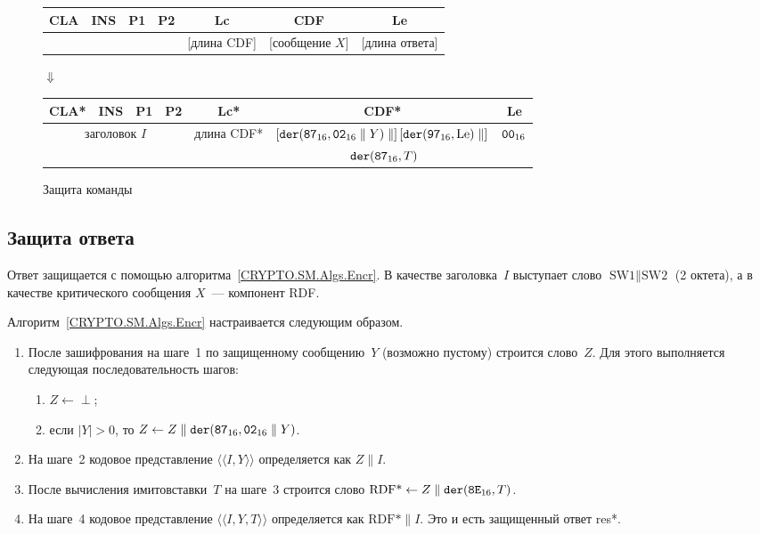 \begin{figure}[!h]
\begin{center}
\begin{tabular}{|c|c|c|c|c|c|c|}
\hline
CLA & INS & P1 & P2 & Lc & CDF & Le \\
\hline
\hline
\multicolumn{4}{|c|}{} & [длина CDF] & [сообщение $X$] & [длина ответа]\\
\hline
\end{tabular}

\vskip3pt$\Downarrow$\vskip3pt

\begin{tabular}{|c|c|c|c|c|c|c|}
\hline
CLA* & INS & P1 & P2 & Lc* & CDF* & Le \\
\hline
\hline
\multicolumn{4}{|c|}{заголовок $I$} & длина CDF* & 
$\left[\texttt{der}(\texttt{87}_{16},\texttt{02}_{16}\parallel Y)\parallel\right]
\left[\texttt{der}(\texttt{97}_{16},\text{Le})\parallel\right]$ & $\texttt{00}_{16}$\\
\multicolumn{4}{|c|}{} & & 
$\phantom{[}\texttt{der}(\texttt{87}_{16},T)$\hfill\mbox{} &\\
\hline
\end{tabular}
\end{center}
\caption{Защита команды}\label{Fig.CMDS.CmdEncr}
\end{figure}

\subsection{Защита ответа}\label{CMDS.SM.EncrRez}

Ответ защищается с помощью алгоритма~\ref{CRYPTO.SM.Algs.Encr}. 
В качестве заголовка~$I$ выступает слово $\text{SW1} \parallel\text{SW2}$ 
(2 октета), а в качестве критического сообщения $X$~--- компонент RDF. 

Алгоритм~\ref{CRYPTO.SM.Algs.Encr} настраивается следующим образом.
\begin{enumerate}
\item
После зашифрования на шаге~1 по защищенному сообщению~$Y$
(возможно пустому) строится слово~$Z$. Для этого выполняется следующая 
последовательность шагов:
\begin{enumerate}
\item
$Z\gets\perp$;
\item
если $|Y|>0$, то $Z\gets Z\parallel\texttt{der}(\texttt{87}_{16},\texttt{02}_{16}\parallel Y)$.
\end{enumerate}
\item
На шаге~2 кодовое представление $\langle\langle I,Y\rangle\rangle$
определяется как $Z\parallel I$.
\item
После вычисления имитовставки~$T$ на шаге~3 строится слово
$\text{RDF*}\gets Z\parallel \texttt{der}(\texttt{8E}_{16}, T)$.
\item
На шаге~4 кодовое представление $\langle\langle I,Y,T\rangle\rangle$
определяется как $\text{RDF*}\parallel I$.
Это и есть защищенный ответ res*.
\end{enumerate}


